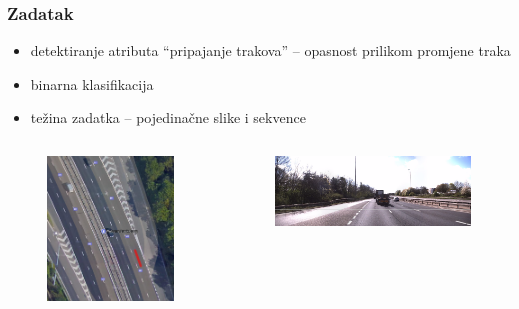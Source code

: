 \documentclass{beamer}
\begin{document}
\begin{frame}
 \frametitle{Zadatak}
 \begin{itemize}
  \item detektiranje atributa ``pripajanje trakova'' -- opasnost prilikom promjene traka
  \item binarna klasifikacija
  \item težina zadatka -- pojedinačne slike i sekvence
 \end{itemize}

 \begin{columns}
\begin{column}{0.5\textwidth}

\begin{figure}[H]
\centering
\includegraphics[scale=0.24]{images/sattelite.png}
\end{figure} 

\end{column}

\begin{column}{0.5\textwidth}
\begin{figure}[H]
\centering
\includegraphics[scale=0.22]{images/car.png}
\end{figure} 


\end{column}
\end{columns}
\end{frame}
\end{document}
